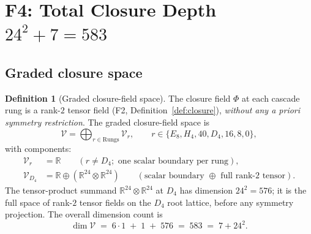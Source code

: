 \documentclass[12pt]{article}
\theoremstyle{definition}
\newtheorem{definition}[theorem]{Definition}
\theoremstyle{remark}
\newcommand{\Vcal}{\mathcal{V}}
\begin{document}
\section{F4: Total Closure Depth $24^2 + 7 = 583$}\label{sec:F4}

\subsection{Graded closure space}

\begin{definition}[Graded closure-field space]\label{def:V}
The closure field $\Phi$ at each cascade rung is a rank-$2$ tensor field (F2, Definition~\ref{def:closure}), \emph{without any a priori symmetry restriction}. The graded closure-field space is
\begin{equation}
\Vcal = \bigoplus_{r \in \mathrm{Rungs}} \Vcal_r, \qquad r \in \{E_8, H_4, 40, D_4, 16, 8, 0\},
\end{equation}
with components:
\begin{align}
\Vcal_r &= \mathbb{R} \qquad (r \neq D_4; \text{ one scalar boundary per rung}),\\
\Vcal_{D_4} &= \mathbb{R} \oplus (\mathbb{R}^{24} \otimes \mathbb{R}^{24}) \qquad (\text{scalar boundary } \oplus \text{ full rank-$2$ tensor}).
\end{align}
The tensor-product summand $\mathbb{R}^{24} \otimes \mathbb{R}^{24}$ at $D_4$ has dimension $24^2 = 576$; it is the full space of rank-$2$ tensor fields on the $D_4$ root lattice, before any symmetry projection. The overall dimension count is
\begin{equation}\label{eq:dim-V}
\dim \Vcal \;=\; 6 \cdot 1 \;+\; 1 \;+\; 576 \;=\; 583 \;=\; 7 + 24^2.
\end{equation}
\end{definition}
\end{document}

